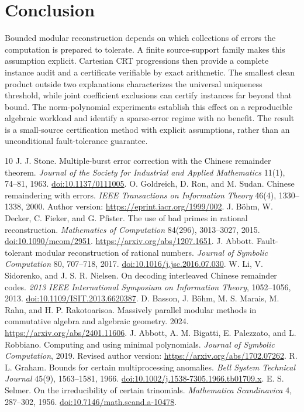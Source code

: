 \documentclass[11pt]{article}
\theoremstyle{definition}\newtheorem{definition}[theorem]{Definition}
\begin{document}
\section{Conclusion}
Bounded modular reconstruction depends on which collections of errors the computation is prepared to tolerate. A finite source-support family makes this assumption explicit. Cartesian CRT progressions then provide a complete instance audit and a certificate verifiable by exact arithmetic. The smallest clean product outside two explanations characterizes the universal uniqueness threshold, while joint coefficient exclusions can certify instances far beyond that bound. The norm-polynomial experiments establish this effect on a reproducible algebraic workload and identify a sparse-error regime with no benefit. The result is a small-source certification method with explicit assumptions, rather than an unconditional fault-tolerance guarantee.

\begin{thebibliography}{10}
 J. J. Stone. Multiple-burst error correction with the Chinese remainder theorem. \emph{Journal of the Society for Industrial and Applied Mathematics} 11(1), 74--81, 1963. \href{https://doi.org/10.1137/0111005}{doi:10.1137/0111005}.
 O. Goldreich, D. Ron, and M. Sudan. Chinese remaindering with errors. \emph{IEEE Transactions on Information Theory} 46(4), 1330--1338, 2000. Author version: \url{https://eprint.iacr.org/1999/002}.
 J. B\"ohm, W. Decker, C. Fieker, and G. Pfister. The use of bad primes in rational reconstruction. \emph{Mathematics of Computation} 84(296), 3013--3027, 2015. \href{https://doi.org/10.1090/mcom/2951}{doi:10.1090/mcom/2951}. \url{https://arxiv.org/abs/1207.1651}.
 J. Abbott. Fault-tolerant modular reconstruction of rational numbers. \emph{Journal of Symbolic Computation} 80, 707--718, 2017. \href{https://doi.org/10.1016/j.jsc.2016.07.030}{doi:10.1016/j.jsc.2016.07.030}.
 W. Li, V. Sidorenko, and J. S. R. Nielsen. On decoding interleaved Chinese remainder codes. \emph{2013 IEEE International Symposium on Information Theory}, 1052--1056, 2013. \href{https://doi.org/10.1109/ISIT.2013.6620387}{doi:10.1109/ISIT.2013.6620387}.
 D. Basson, J. B\"ohm, M. S. Marais, M. Rahn, and H. P. Rakotoarisoa. Massively parallel modular methods in commutative algebra and algebraic geometry. 2024. \url{https://arxiv.org/abs/2401.11606}.
 J. Abbott, A. M. Bigatti, E. Palezzato, and L. Robbiano. Computing and using minimal polynomials. \emph{Journal of Symbolic Computation}, 2019. Revised author version: \url{https://arxiv.org/abs/1702.07262}.
 R. L. Graham. Bounds for certain multiprocessing anomalies. \emph{Bell System Technical Journal} 45(9), 1563--1581, 1966. \href{https://doi.org/10.1002/j.1538-7305.1966.tb01709.x}{doi:10.1002/j.1538-7305.1966.tb01709.x}.
 E. S. Selmer. On the irreducibility of certain trinomials. \emph{Mathematica Scandinavica} 4, 287--302, 1956. \href{https://doi.org/10.7146/math.scand.a-10478}{doi:10.7146/math.scand.a-10478}.
\end{thebibliography}
\end{document}
